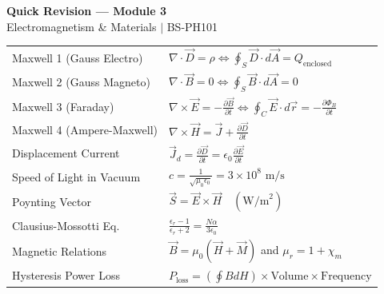 \documentclass[12pt,a4paper]{article}
\renewcommand{\arraystretch}{1.45}
\begin{document}
\newpage
\begin{center}
  {\large\bfseries\color{myred} Quick Revision --- Module 3}\\[3pt]
  {\small\color{mydark} Electromagnetism \& Materials $|$ BS-PH101}
\end{center}
\noindent{\color{myred}\rule{\linewidth}{1.2pt}}
\vspace{4pt}

\begin{tcolorbox}[formulabox, title={\textbf{Key Formulas and Metrics at a Glance}}]
\renewcommand{\arraystretch}{1.35}
\begin{tabularx}{\linewidth}{B{5.0cm} X}
Maxwell 1 (Gauss Electro) & $\nabla \cdot \vec{D} = \rho \iff \oint_S \vec{D} \cdot d\vec{A} = Q_{\text{enclosed}}$ \\[4pt]
Maxwell 2 (Gauss Magneto) & $\nabla \cdot \vec{B} = 0 \iff \oint_S \vec{B} \cdot d\vec{A} = 0$ \\[4pt]
Maxwell 3 (Faraday) & $\nabla \times \vec{E} = -\frac{\partial \vec{B}}{\partial t} \iff \oint_C \vec{E} \cdot d\vec{r} = -\frac{\partial\Phi_B}{\partial t}$ \\[4pt]
Maxwell 4 (Ampere-Maxwell) & $\nabla \times \vec{H} = \vec{J} + \frac{\partial \vec{D}}{\partial t}$ \\[4pt]
Displacement Current & $\vec{J}_d = \frac{\partial \vec{D}}{\partial t} = \epsilon_0 \frac{\partial \vec{E}}{\partial t}$ \\[4pt]
Speed of Light in Vacuum & $c = \frac{1}{\sqrt{\mu_0 \epsilon_0}} = 3 \times 10^8\text{ m/s}$ \\[4pt]
Poynting Vector & $\vec{S} = \vec{E} \times \vec{H} \quad (\text{W/m}^2)$ \\[4pt]
Clausius-Mossotti Eq. & $\frac{\epsilon_r - 1}{\epsilon_r + 2} = \frac{N \alpha}{3 \epsilon_0}$ \\[4pt]
Magnetic Relations & $\vec{B} = \mu_0(\vec{H} + \vec{M})$ \quad and \quad $\mu_r = 1 + \chi_m$ \\[4pt]
Hysteresis Power Loss & $P_{\text{loss}} = (\oint B dH) \times \text{Volume} \times \text{Frequency}$ \\[4pt]
\end{tabularx}
\end{tcolorbox}
\end{document}
